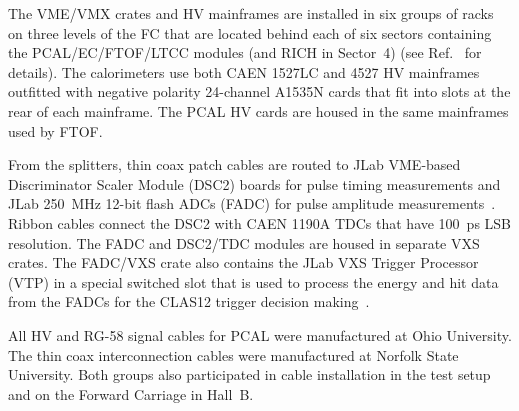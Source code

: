 The VME/VMX crates and HV mainframes are installed in six groups of racks on three levels of the FC that are located
behind each of six sectors containing the PCAL/EC/FTOF/LTCC modules (and RICH in Sector~4) (see
Ref.~\cite{nim:overview} for details). The calorimeters use both CAEN 1527LC and 4527 HV mainframes outfitted
with negative polarity 24-channel A1535N cards that fit into slots at the rear of each mainframe. The PCAL HV
cards are housed in the same mainframes used by FTOF.  

From the splitters, thin coax patch cables are routed to JLab VME-based Discriminator Scaler Module (DSC2) boards for pulse timing measurements and JLab 250~MHz 12-bit flash ADCs (FADC) for pulse amplitude measurements~\cite{nim:daq}. Ribbon cables
connect the DSC2 with CAEN 1190A TDCs that have 100~ps LSB resolution. The FADC and DSC2/TDC modules
are housed in separate VXS crates. The FADC/VXS crate also contains the JLab VXS Trigger Processor (VTP) in a
special switched slot that is used to process the energy and hit data from the FADCs for the CLAS12 trigger decision making~\cite{nim:daq,nim:trig}.  

All HV and RG-58 signal cables for PCAL were manufactured at Ohio University. The thin coax interconnection
cables were  manufactured at Norfolk State University. Both groups also participated in cable installation
in the test setup and on the Forward Carriage in Hall~B.  

